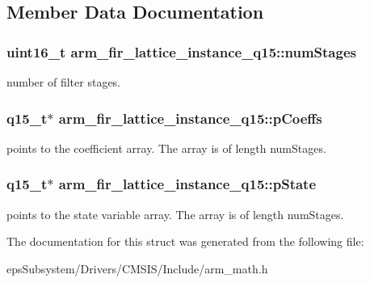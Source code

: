 \subsection{Member Data Documentation}
\hypertarget{structarm__fir__lattice__instance__q15_a38b179138d6a6c9cac4f8f79b6fd5357}{
\subsubsection[{num\-Stages}]{\setlength{\rightskip}{0pt plus 5cm}uint16\-\_\-t arm\-\_\-fir\-\_\-lattice\-\_\-instance\-\_\-q15\-::num\-Stages}}\label{structarm__fir__lattice__instance__q15_a38b179138d6a6c9cac4f8f79b6fd5357}
number of filter stages. \hypertarget{structarm__fir__lattice__instance__q15_a78f872826140069cf67836fff87360bc}{
\subsubsection[{p\-Coeffs}]{\setlength{\rightskip}{0pt plus 5cm}q15\-\_\-t$\ast$ arm\-\_\-fir\-\_\-lattice\-\_\-instance\-\_\-q15\-::p\-Coeffs}}\label{structarm__fir__lattice__instance__q15_a78f872826140069cf67836fff87360bc}
points to the coefficient array. The array is of length num\-Stages. \hypertarget{structarm__fir__lattice__instance__q15_a37b90dea2bc3ee7c9951a9fe74db0cbb}{
\subsubsection[{p\-State}]{\setlength{\rightskip}{0pt plus 5cm}q15\-\_\-t$\ast$ arm\-\_\-fir\-\_\-lattice\-\_\-instance\-\_\-q15\-::p\-State}}\label{structarm__fir__lattice__instance__q15_a37b90dea2bc3ee7c9951a9fe74db0cbb}
points to the state variable array. The array is of length num\-Stages. 

The documentation for this struct was generated from the following file\-:\begin{DoxyCompactItemize}
\item 
eps\-Subsystem/\-Drivers/\-C\-M\-S\-I\-S/\-Include/arm\-\_\-math.\-h\end{DoxyCompactItemize}
